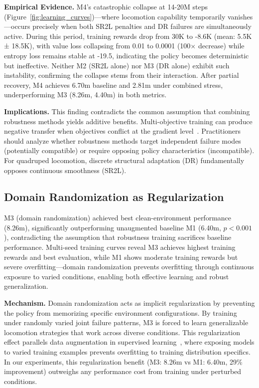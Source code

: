 \documentclass[conference]{IEEEtran}
\begin{document}
\textbf{Empirical Evidence.} M4's catastrophic collapse at 14-20M steps (Figure~\ref{fig:learning_curves})—where locomotion capability temporarily vanishes—occurs precisely when both SR2L penalties and DR failures are simultaneously active. During this period, training rewards drop from 30K to -8.6K (mean: 5.5K ± 18.5K), with value loss collapsing from 0.01 to 0.0001 (100× decrease) while entropy loss remains stable at -19.5, indicating the policy becomes deterministic but ineffective. Neither M2 (SR2L alone) nor M3 (DR alone) exhibit such instability, confirming the collapse stems from their interaction. After partial recovery, M4 achieves 6.70m baseline and 2.81m under combined stress, underperforming M3 (8.26m, 4.40m) in both metrics.

\textbf{Implications.} This finding contradicts the common assumption that combining robustness methods yields additive benefits. Multi-objective training can produce negative transfer when objectives conflict at the gradient level~\cite{standley2020tasks}. Practitioners should analyze whether robustness methods target independent failure modes (potentially compatible) or require opposing policy characteristics (incompatible). For quadruped locomotion, discrete structural adaptation (DR) fundamentally opposes continuous smoothness (SR2L).

\subsection{Domain Randomization as Regularization}

M3 (domain randomization) achieved best clean-environment performance (8.26m), significantly outperforming unaugmented baseline M1 (6.40m, $p<0.001$), contradicting the assumption that robustness training sacrifices baseline performance. Multi-seed training curves reveal M3 achieves highest training rewards and best evaluation, while M1 shows moderate training rewards but severe overfitting—domain randomization prevents overfitting through continuous exposure to varied conditions, enabling both effective learning and robust generalization.

\textbf{Mechanism.} Domain randomization acts as implicit regularization by preventing the policy from memorizing specific environment configurations. By training under randomly varied joint failure patterns, M3 is forced to learn generalizable locomotion strategies that work across diverse conditions. This regularization effect parallels data augmentation in supervised learning~\cite{shorten2019survey}, where exposing models to varied training examples prevents overfitting to training distribution specifics. In our experiments, this regularization benefit (M3: 8.26m vs M1: 6.40m, 29\% improvement) outweighs any performance cost from training under perturbed conditions.
\end{document}
